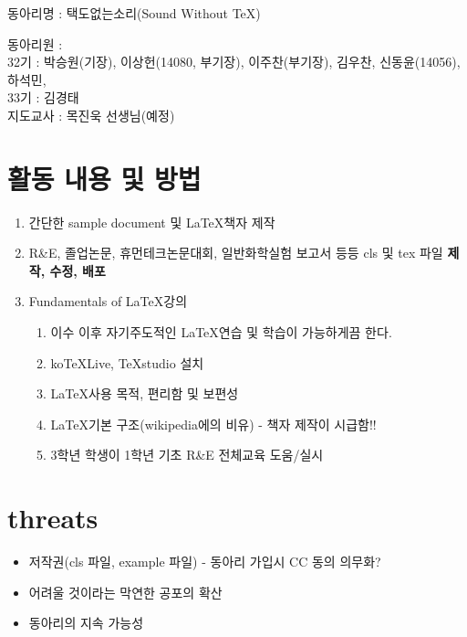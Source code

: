 \documentclass[11pt]{article}
\begin{document}
\begin{center}
	\Large 동아리명 : 택도없는소리(Sound Without \TeX)
\end{center}
\begin{flushright}
	동아리원 : \\
	32기 : 박승원(기장), 이상헌(14080, 부기장), 이주찬(부기장), 김우찬, 신동윤(14056), 하석민,  \\
	33기 : 김경태 \\
	지도교사 : 목진욱 선생님(예정)
\end{flushright}
\section{활동 내용 및 방법}
\begin{enumerate}
\item 간단한 sample document 및 \LaTeX 책자 제작
\item R\&E, 졸업논문, 휴먼테크논문대회, 일반화학실험 보고서 등등 cls 및 tex 파일 {\bf 제작, 수정, 배포}
\item Fundamentals of \LaTeX 강의
\begin{enumerate}
	\item 이수 이후 자기주도적인 \LaTeX 연습 및 학습이 가능하게끔 한다.
	\item koTeXLive, TeXstudio 설치
	\item \LaTeX 사용 목적, 편리함 및 보편성
	\item \LaTeX 기본 구조(wikipedia에의 비유) - 책자 제작이 시급함!!
	\item \checkmark 3학년 학생이 1학년 기초 R\&E 전체교육 도움/실시
\end{enumerate}
\end{enumerate}

\section{threats}
\begin{itemize}
\item 저작권(cls 파일, example 파일) - 동아리 가입시 CC 동의 의무화?
\item 어려울 것이라는 막연한 공포의 확산
\item 동아리의 지속 가능성
\end{itemize}
\end{document}
